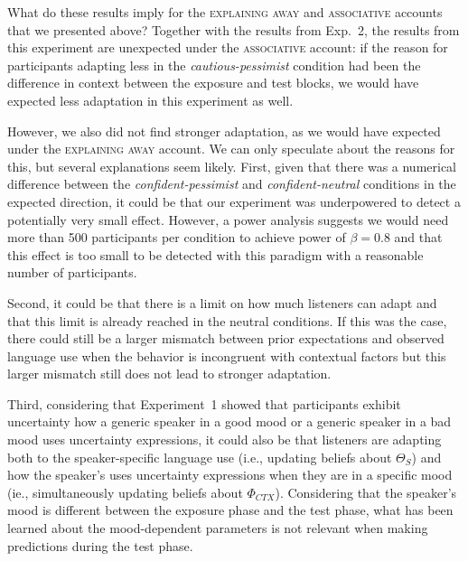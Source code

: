 \documentclass[man,floatsintext]{apa6}
\newcommand{\jd}[1]{\textcolor{Purple}{\bf [jd: #1]}}
\begin{document}
What do these results imply for the \textsc{explaining away} and \textsc{associative} accounts that we presented above? Together with the results from Exp.~2, the results from this experiment are unexpected under the \textsc{associative} account: if the reason for participants adapting less in the \textit{cautious-pessimist} condition had been the difference in context between the exposure and test blocks, we would have expected less adaptation in this experiment as well.

However, we also did not find stronger adaptation, as we would have expected under the \textsc{explaining away} account. We can only speculate about the reasons for this, but several explanations seem likely. First, given that there was a numerical difference between the \textit{confident-pessimist} and \textit{confident-neutral} conditions in the expected direction, it could be that our experiment was underpowered to detect a potentially very small effect. However, a power analysis suggests we would need more than 500 participants per condition to achieve power of $\beta=0.8$ and that this effect is too small to be detected with this paradigm with a reasonable number of participants.

Second, it could be that there is a limit on how much listeners can adapt and that this limit is already reached in the neutral conditions. If this was the case, there could still be a larger mismatch between prior expectations and observed language use when the behavior is incongruent with contextual factors but this larger mismatch still does not lead to stronger adaptation. 

Third, considering that Experiment~1 showed that participants exhibit uncertainty how a generic speaker in a good mood or a generic speaker in a bad mood uses uncertainty expressions, it could also be that listeners are adapting both to the speaker-specific language use (i.e., updating beliefs about $\Theta_S$) and how the speaker's uses uncertainty expressions when they are in a specific mood (ie., simultaneously updating beliefs about $\Phi_{CTX}$). Considering that the speaker's mood is different between the exposure phase and the test phase, what has been learned about the mood-dependent parameters is not relevant when making predictions during the test phase.    

\end{document}
